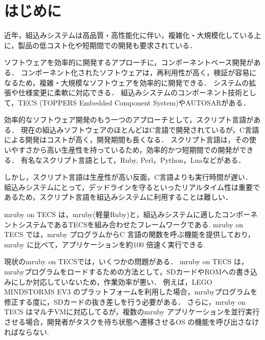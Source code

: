 \documentclass[submit,techrep]{ipsj}
\begin{document}

\maketitle

\section{はじめに}
\vspace{-2mm}
近年，組込みシステムは高品質・高性能化に伴い，複雑化・大規模化している上に，製品の低コスト化や短期間での開発も要求されている．

ソフトウェアを効率的に開発するアプローチに，コンポーネントベース開発がある．
コンポーネント化されたソフトウェアは，再利用性が高く，検証が容易になるため，複雑・大規模なソフトウェアを効率的に開発できる．
システムの拡張や仕様変更に柔軟に対応できる．
組込みシステムのコンポーネント技術として，TECS (TOPPERS Embedded Component System)\cite{par:TECS}やAUTOSAR\cite{url:AUTOSAR}がある．

効率的なソフトウェア開発のもう一つのアプローチとして，スクリプト言語がある．
現在の組込みソフトウェアのほとんどはC言語で開発されているが，C言語による開発はコストが高く，開発期間も長くなる．
スクリプト言語は，その使いやすさから高い生産性を持っているため，効率的かつ短期間での開発ができる．
有名なスクリプト言語として，Ruby, Perl，Python，Luaなどがある．

しかし，スクリプト言語は生産性が高い反面，C言語よりも実行時間が遅い．
組込みシステムにとって，デッドラインを守るといったリアルタイム性は重要であるため，スクリプト言語を組込みシステムに利用することは難しい．

mruby on TECS は，mruby(軽量Ruby)\cite{par:mruby}と，組込みシステムに適したコンポーネントシステムであるTECSを組み合わせたフレームワークである\cite{par:mrubyonTECS}.
mruby on TECS では，mruby プログラムからC 言語の関数を呼ぶ機能を提供しており，mruby に比べて，アプリケーションを約100 倍速く実行できる.

現状のmruby on TECSでは，いくつかの問題がある．
mruby on TECS は，mrubyプログラムをロードするための方法として，SDカードやROMへの書き込みにしか対応していないため，作業効率が悪い．
例えば，LEGO MINDSTORMS EV3 のプラットフォーム\cite{par:EV3}を利用した場合，mrubyプログラムを修正する度に，SDカードの抜き差しを行う必要がある．
さらに，mruby on TECS はマルチVMに対応してるが，複数のmruby アプリケーションを並行実行させる場合，開発者がタスクを待ち状態へ遷移させるOS の機能を呼び出さなければならない.
\end{document}
